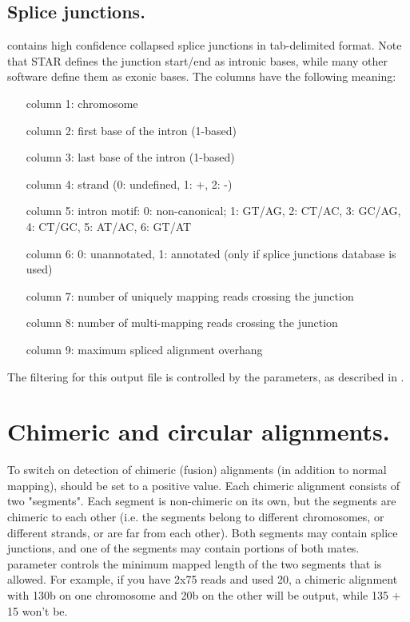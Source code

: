 \documentclass[12pt]{article}
\begin{document}
\subsection{Splice junctions.}
 contains high confidence collapsed splice junctions in tab-delimited format. 
Note that STAR defines the junction start/end as intronic bases, while many other software define them as exonic bases.
The columns have the following meaning:
\begin{itemize}[leftmargin=1in]
\item[column 1:] chromosome
\item[column 2:] first base of the intron (1-based)
\item[column 3:] last base of the intron (1-based)
\item[column 4:] strand (0: undefined, 1: +, 2: -)
\item[column 5:] intron motif: 0: non-canonical; 1: GT/AG, 2: CT/AC, 3: GC/AG, 4: CT/GC, 5: AT/AC, 6: GT/AT
\item[column 6:] 0: unannotated, 1: annotated (only  if splice junctions database is used)
\item[column 7:] number of uniquely mapping reads crossing the junction
\item[column 8:] number of multi-mapping reads crossing the junction
\item[column 9:] maximum spliced alignment overhang 
\end{itemize}
The filtering for this output file is controlled by the  parameters, as described in .

\section{Chimeric and circular alignments.}
To switch on detection of chimeric (fusion) alignments (in addition to normal mapping),  should be set to a positive value. Each chimeric alignment consists of two "segments". Each segment is non-chimeric on its own, but the segments are chimeric to each other (i.e. the segments belong to different chromosomes, or different strands, or are far from each other). Both segments may contain splice junctions, and one of the segments may contain portions of both mates.  parameter controls the minimum mapped length of the two segments that is allowed. For example, if you have 2x75 reads and used  20, a chimeric alignment with 130b on one chromosome and 20b on the other will be output, while 135 + 15 won't be.
\end{document}
